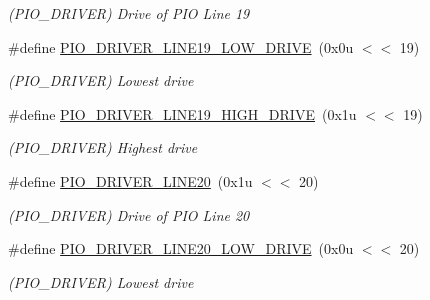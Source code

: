 \begin{DoxyCompactItemize}
\begin{DoxyCompactList}\small\item\em (P\+I\+O\+\_\+\+D\+R\+I\+V\+ER) Drive of P\+IO Line 19 \end{DoxyCompactList}\item 
\mbox{\label{group__SAMV71__PIO_ga9ccf13eb1f24774ba50fe95f8957378b}} 
\#define \mbox{\hyperlink{group__SAMV71__PIO_ga9ccf13eb1f24774ba50fe95f8957378b}{P\+I\+O\+\_\+\+D\+R\+I\+V\+E\+R\+\_\+\+L\+I\+N\+E19\+\_\+\+L\+O\+W\+\_\+\+D\+R\+I\+VE}}~(0x0u $<$$<$ 19)
\begin{DoxyCompactList}\small\item\em (P\+I\+O\+\_\+\+D\+R\+I\+V\+ER) Lowest drive \end{DoxyCompactList}\item 
\mbox{\label{group__SAMV71__PIO_gaf8a905aa93d4aac65d77c28dc690f58b}} 
\#define \mbox{\hyperlink{group__SAMV71__PIO_gaf8a905aa93d4aac65d77c28dc690f58b}{P\+I\+O\+\_\+\+D\+R\+I\+V\+E\+R\+\_\+\+L\+I\+N\+E19\+\_\+\+H\+I\+G\+H\+\_\+\+D\+R\+I\+VE}}~(0x1u $<$$<$ 19)
\begin{DoxyCompactList}\small\item\em (P\+I\+O\+\_\+\+D\+R\+I\+V\+ER) Highest drive \end{DoxyCompactList}\item 
\mbox{\label{group__SAMV71__PIO_ga9508975d98d9cbcc937f20b69c6789ee}} 
\#define \mbox{\hyperlink{group__SAMV71__PIO_ga9508975d98d9cbcc937f20b69c6789ee}{P\+I\+O\+\_\+\+D\+R\+I\+V\+E\+R\+\_\+\+L\+I\+N\+E20}}~(0x1u $<$$<$ 20)
\begin{DoxyCompactList}\small\item\em (P\+I\+O\+\_\+\+D\+R\+I\+V\+ER) Drive of P\+IO Line 20 \end{DoxyCompactList}\item 
\mbox{\label{group__SAMV71__PIO_gab142ac0a23a4135afea1447367e8e202}} 
\#define \mbox{\hyperlink{group__SAMV71__PIO_gab142ac0a23a4135afea1447367e8e202}{P\+I\+O\+\_\+\+D\+R\+I\+V\+E\+R\+\_\+\+L\+I\+N\+E20\+\_\+\+L\+O\+W\+\_\+\+D\+R\+I\+VE}}~(0x0u $<$$<$ 20)
\begin{DoxyCompactList}\small\item\em (P\+I\+O\+\_\+\+D\+R\+I\+V\+ER) Lowest drive \end{DoxyCompactList}\item 

\end{DoxyCompactItemize}
